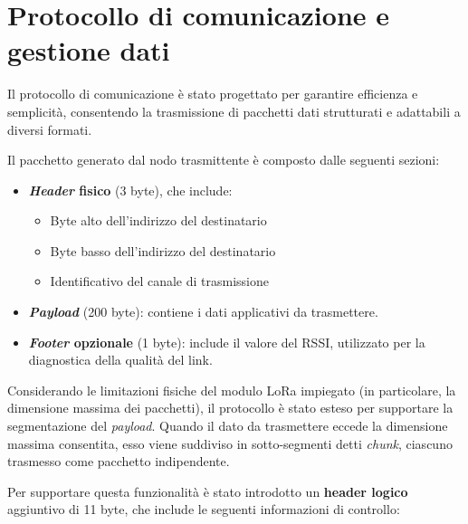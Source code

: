\documentclass[12pt,a4paper,twoside]{book}
\begin{document}
\section{Protocollo di comunicazione e gestione dati}

Il protocollo di comunicazione è stato progettato per garantire efficienza e
semplicità, consentendo la trasmissione di pacchetti dati strutturati e adattabili
a diversi formati.

Il pacchetto generato dal nodo trasmittente è composto dalle seguenti sezioni:

\begin{itemize}
    \item \textbf{\emph{Header} fisico} (3 byte), che include:
          \begin{itemize}
              \item Byte alto dell’indirizzo del destinatario
              \item Byte basso dell’indirizzo del destinatario
              \item Identificativo del canale di trasmissione
          \end{itemize}
    \item \textbf{\emph{Payload}} (200 byte): contiene i dati applicativi da trasmettere.

    \item \textbf{\emph{Footer} opzionale} (1 byte): include il valore del \ac{RSSI},
          utilizzato per la diagnostica della qualità del link.
\end{itemize}

Considerando le limitazioni fisiche del modulo \ac{LoRa} impiegato (in particolare,
la dimensione massima dei pacchetti), il protocollo è stato esteso per supportare
la segmentazione del \emph{payload}. Quando il dato da trasmettere eccede la dimensione
massima consentita, esso viene suddiviso in sotto-segmenti detti \emph{chunk},
ciascuno trasmesso come pacchetto indipendente.

Per supportare questa funzionalità è stato introdotto un \textbf{header logico}
aggiuntivo di 11 byte, che include le seguenti informazioni di controllo:
\end{document}
